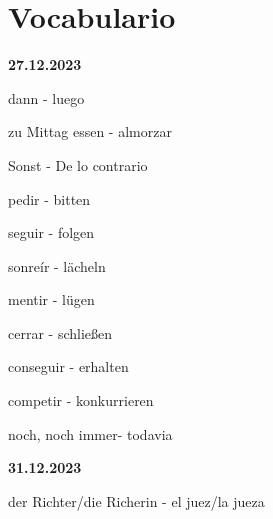 \chapter{Vocabulario}
\begin{vocabulario}
    \item \textbf{27.12.2023}
    \item dann - luego
    \item zu Mittag essen - almorzar
    \item Sonst - De lo contrario
    \item pedir - bitten
    \item seguir - folgen
    \item sonre\'ir - lächeln 
    \item mentir - lügen
    \item cerrar - schließen
    \item conseguir - erhalten
    \item competir - konkurrieren
    \item noch, noch immer- todavia
\end{vocabulario}

\begin{vocabulario}
    \item \textbf{31.12.2023}
    \item der Richter/die Richerin - el juez/la jueza
\end{vocabulario}